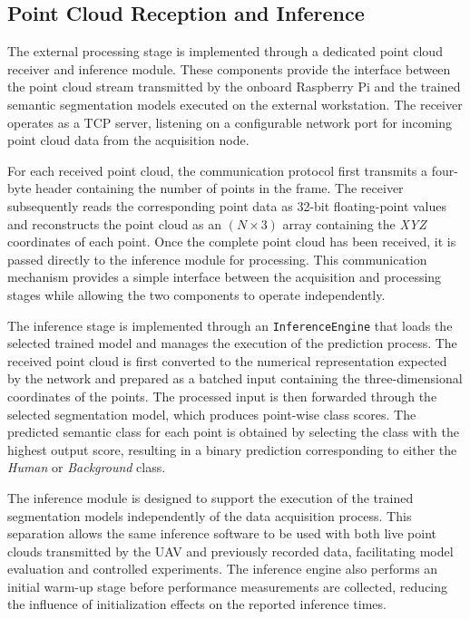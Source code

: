 \subsection{Point Cloud Reception and Inference}
\label{subsec:receiver_inference}

The external processing stage is implemented through a dedicated point cloud receiver and inference module. These components provide the interface between the point cloud stream transmitted by the onboard Raspberry Pi and the trained semantic segmentation models executed on the external workstation. The receiver operates as a TCP server, listening on a configurable network port for incoming point cloud data from the acquisition node.

For each received point cloud, the communication protocol first transmits a four-byte header containing the number of points in the frame. The receiver subsequently reads the corresponding point data as 32-bit floating-point values and reconstructs the point cloud as an $(N\times3)$ array containing the \textit{XYZ} coordinates of each point. Once the complete point cloud has been received, it is passed directly to the inference module for processing. This communication mechanism provides a simple interface between the acquisition and processing stages while allowing the two components to operate independently.

The inference stage is implemented through an \texttt{InferenceEngine} that loads the selected trained model and manages the execution of the prediction process. The received point cloud is first converted to the numerical representation expected by the network and prepared as a batched input containing the three-dimensional coordinates of the points. The processed input is then forwarded through the selected segmentation model, which produces point-wise class scores. The predicted semantic class for each point is obtained by selecting the class with the highest output score, resulting in a binary prediction corresponding to either the \textit{Human} or \textit{Background} class.

The inference module is designed to support the execution of the trained segmentation models independently of the data acquisition process. This separation allows the same inference software to be used with both live point clouds transmitted by the UAV and previously recorded data, facilitating model evaluation and controlled experiments. The inference engine also performs an initial warm-up stage before performance measurements are collected, reducing the influence of initialization effects on the reported inference times.

